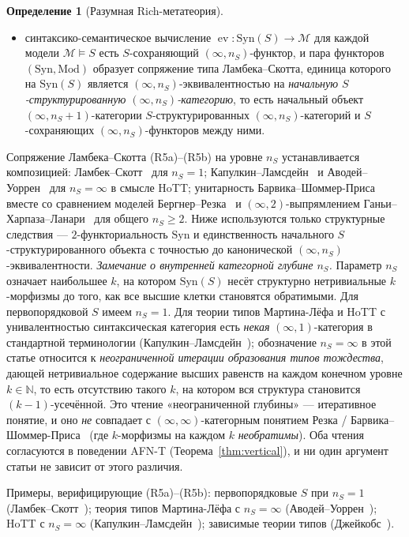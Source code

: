 \documentclass[11pt]{article}
\theoremstyle{plain}
\theoremstyle{definition}
\newtheorem{definition}[theorem]{Определение}
\newcommand{\cM}{\mathcal{M}}
\newcommand{\Syn}{\mathrm{Syn}}
\newcommand{\Mod}{\mathrm{Mod}}
\DeclareMathOperator{\ev}{ev}
\begin{document}
\begin{definition}[Разумная Rich-метатеория]
\begin{itemize}
\begin{itemize}
\item[\textbf{(R5b)}] синтаксико-семантическое вычисление $\ev : \Syn(S) \to \cM$ для каждой модели $\cM \models S$ есть $S$-сохраняющий $(\infty, n_S)$-функтор, и пара функторов $(\Syn, \Mod)$ образует сопряжение типа Ламбека--Скотта, единица которого на $\Syn(S)$ является $(\infty, n_S)$-эквивалентностью на \emph{начальную $S$-структурированную $(\infty, n_S)$-категорию}, то есть начальный объект $(\infty, n_S + 1)$-категории $S$-структурированных $(\infty, n_S)$-категорий и $S$-сохраняющих $(\infty, n_S)$-функторов между ними.
\end{itemize}
Сопряжение Ламбека--Скотта (R5a)--(R5b) на уровне $n_S$ устанавливается композицией: Ламбек--Скотт~\cite{LambekScott1986} для $n_S = 1$; Капулкин--Ламсдейн~\cite{KapulkinLumsdaine2021} и Аводей--Уоррен~\cite{AwodeyWarren2009} для $n_S = \infty$ в смысле HoTT; унитарность Барвика--Шоммер-Приса~\cite{BarwickSchommerPries2021} вместе со сравнением моделей Бергнер--Резка~\cite{BergnerRezk2013} и $(\infty, 2)$-выпрямлением Ганьи--Харпаза--Ланари~\cite{GagnaHarpazLanari2021} для общего $n_S \geq 2$. Ниже используются только структурные следствия --- $2$-функториальность $\Syn$ и единственность начального $S$-структурированного объекта с точностью до канонической $(\infty, n_S)$-эквивалентности.
\emph{Замечание о внутренней категорной глубине $n_S$.} Параметр $n_S$ означает наибольшее $k$, на котором $\Syn(S)$ несёт структурно нетривиальные $k$-морфизмы до того, как все высшие клетки становятся обратимыми. Для первопорядковой $S$ имеем $n_S = 1$. Для теории типов Мартина-Лёфа и HoTT с унивалентностью синтаксическая категория есть \emph{некая} $(\infty, 1)$-категория в стандартной терминологии (Капулкин--Ламсдейн~\cite{KapulkinLumsdaine2021}); обозначение $n_S = \infty$ в этой статье относится к \emph{неограниченной итерации образования типов тождества}, дающей нетривиальное содержание высших равенств на каждом конечном уровне $k \in \mathbb{N}$, то есть отсутствию такого $k$, на котором вся структура становится $(k-1)$-усечённой. Это чтение «неограниченной глубины» — итеративное понятие, и оно \emph{не} совпадает с $(\infty, \infty)$-категорным понятием Резка / Барвика--Шоммер-Приса~\cite{BarwickSchommerPries2021} (где $k$-морфизмы на каждом $k$ \emph{необратимы}). Оба чтения согласуются в поведении AFN-T (Теорема~\ref{thm:vertical}), и ни один аргумент статьи не зависит от этого различия.

Примеры, верифицирующие (R5a)--(R5b): первопорядковые $S$ при $n_S = 1$ (Ламбек--Скотт~\cite{LambekScott1986}); теория типов Мартина-Лёфа с $n_S = \infty$ (Аводей--Уоррен~\cite{AwodeyWarren2009}); HoTT с $n_S = \infty$ (Капулкин--Ламсдейн~\cite{KapulkinLumsdaine2021}); зависимые теории типов (Джейкобс~\cite{Jacobs1999}).
\end{itemize}
\end{definition}
\end{document}
